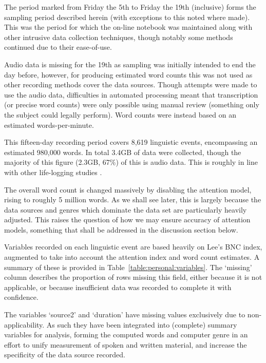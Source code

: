 The period marked from Friday the 5th to Friday the 19th (inclusive) forms the sampling period described herein (with exceptions to this noted where made).  This was the period for which the on-line notebook was maintained along with other intrusive data collection techniques, though notably some methods continued due to their ease-of-use.

Audio data is missing for the 19th as sampling was initially intended to end the day before, however, for producing estimated word counts this was not used as other recording methods cover the data sources.  Though attempts were made to use the audio data, difficulties in automated processing meant that transcription (or precise word counts) were only possible using manual review (something only the subject could legally perform).  Word counts were instead based on an estimated words-per-minute.


This fifteen-day recording period covers 8,619 linguistic events, encompassing an estimated 980,000 words.  In total 3.4GB of data were collected, though the majority of this figure (2.3GB, 67\%) of this is audio data.  This is roughly in line with other life-logging studies .

The overall word count is changed massively by disabling the attention model, rising to roughly 5 million words.  As we shall see later, this is largely because the data sources and genres which dominate the data set are particularly heavily adjusted.  This raises the question of how we may ensure accuracy of attention models, something that shall be addressed in the discussion section below.





Variables recorded on each linguistic event are based heavily on Lee's BNC index, augmented to take into account the attention index and word count estimates.  A summary of these is provided in Table~\ref{table:personal:variables}.  The `missing' column describes the proportion of rows missing this field, either because it is not applicable, or because insufficient data was recorded to complete it with confidence.

The variables `source2' and `duration' have missing values exclusively due to non-applicability.  As such they have been integrated into (complete) summary variables for analysis, forming the computed words and computer genre in an effort to unify measurement of spoken and written material, and increase the specificity of the data source recorded.

